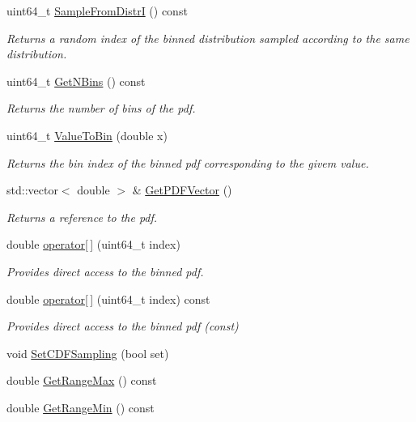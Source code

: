 \begin{DoxyCompactItemize}
uint64\-\_\-t \hyperlink{classDistribution_aeaaf3037d0c8167d4c41fe4213df3181}{Sample\-From\-Distr\-I} () const 
\begin{DoxyCompactList}\small\item\em Returns a random index of the binned distribution sampled according to the same distribution. \end{DoxyCompactList}\item 
uint64\-\_\-t \hyperlink{classDistribution_a8d5beb423a42b4acb0724e24ddb05195}{Get\-N\-Bins} () const 
\begin{DoxyCompactList}\small\item\em Returns the number of bins of the pdf. \end{DoxyCompactList}\item 
uint64\-\_\-t \hyperlink{classDistribution_a14d717bbe93f876772eead67bd413f2b}{Value\-To\-Bin} (double x)
\begin{DoxyCompactList}\small\item\em Returns the bin index of the binned pdf corresponding to the givem value. \end{DoxyCompactList}\item 
std\-::vector$<$ double $>$ \& \hyperlink{classDistribution_a58298747fcca2bd64976ae247df3f3e5}{Get\-P\-D\-F\-Vector} ()
\begin{DoxyCompactList}\small\item\em Returns a reference to the pdf. \end{DoxyCompactList}\item 
double \hyperlink{classDistribution_a52415dcd5a27eb454df64912597eb95a}{operator\mbox{[}$\,$\mbox{]}} (uint64\-\_\-t index)
\begin{DoxyCompactList}\small\item\em Provides direct access to the binned pdf. \end{DoxyCompactList}\item 
double \hyperlink{classDistribution_a7e969b8ea60baa6498ca6951b205f967}{operator\mbox{[}$\,$\mbox{]}} (uint64\-\_\-t index) const 
\begin{DoxyCompactList}\small\item\em Provides direct access to the binned pdf (const) \end{DoxyCompactList}\item 
void \hyperlink{classDistribution_a9cc42751d710907d76d97813b8fa8697}{Set\-C\-D\-F\-Sampling} (bool set)
\item 
double \hyperlink{classDistribution_a3802925dff4de220fbe8e214e42e1e33}{Get\-Range\-Max} () const 
\item 
double \hyperlink{classDistribution_a10e8b59653c735c0dceae1d3c15b2713}{Get\-Range\-Min} () const 
\end{DoxyCompactItemize}
